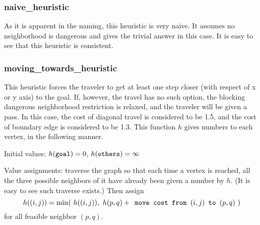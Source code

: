\documentclass[11pt]{article}
\begin{document}
			\subsubsection{naive\_heuristic}
				As it is apparent in the naming, this heuristic is very naive. It assumes no neighborhood is dangerous and gives the trivial answer in this case. It is easy to see that this heuristic is consistent.
			
			\subsubsection{moving\_towards\_heuristic}
				This heuristic forces the traveler to get at least one step closer (with respect of x or y axis) to the goal. If, however, the travel has no such option, the blocking dangerous neighborhood restriction is relaxed, and the traveler will be given a pass. In this case, the cost of diagonal travel is considered to be 1.5, and the cost of boundary edge is considered to be 1.3. This function $h$ gives numbers to each vertex, in the following manner.
				
				Initial values:
					$h( \verb|goal| )= 0$, \quad
					$h( \verb|others| )= \infty$
				
				Value assignments:
				traverse the graph so that each time a vertex is reached, all the three possible neighbors of it have already been given a number by $h$. (It is easy to see such traverse exists.) Then assign
				$$ h( (i, j) )= \min(\ h( (i, j) ),\ h(p, q) + \verb| move cost from | (i, j) \verb| to | (p,q)\ )$$
				for all feasible neighbor $(p, q)$.
				
\end{document}
